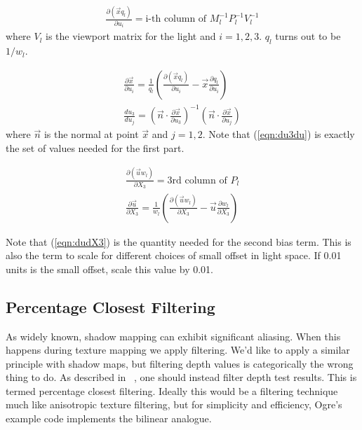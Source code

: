 \documentclass[]{article}  %
\begin{document}
\begin{eqnarray}  
\label{eqn:dxqdu}
  \frac{\partial (\vec{x} q_l)}{\partial u_i} = \mbox{i-th column of } M_l^{-1} P_l^{-1} V_l^{-1} 
\end{eqnarray}
where $V_l$ is the viewport matrix for the light and $i=1,2,3$.  $q_l$ turns out to be $1/w_l$.

\begin{eqnarray} 
\label{eqn:dxdu}
  \frac{\partial \vec{x}}{\partial u_i} = \frac{1}{q_l} \left( \frac{\partial (\vec{x} q_l)}{\partial u_i} - \vec{x}\frac{\partial q_l}{\partial u_i} \right) \\
\label{eqn:du3du}
  \frac{du_3}{du_j} = \left( \vec{n} \cdot \frac{\partial \vec{x}}{\partial u_3} \right)^{-1} \left( \vec{n} \cdot \frac{\partial \vec{x}}{\partial u_j} \right)
\end{eqnarray}
where $\vec{n}$ is the normal at point $\vec{x}$ and $j=1,2$.  Note that (\ref{eqn:du3du}) is exactly the set of values needed for the first part.


\begin{eqnarray}  
\label{eqn:duwdX3}
  \frac{\partial (\vec{u} w_l)}{\partial X_3} = \mbox{3rd column of } P_l \\
\label{eqn:dudX3}
  \frac{\partial \vec{u}}{\partial X_3} = \frac{1}{w_l} \left( \frac{\partial (\vec{u} w_l)}{\partial X_3} - \vec{u}\frac{\partial w_l}{\partial X_3} \right)
\end{eqnarray}

Note that (\ref{eqn:dudX3}) is the quantity needed for the second bias term.  This is also the term to scale for different choices of small offset in light space.  If 0.01 units is the small offset, scale this value by 0.01.  

\subsection{Percentage Closest Filtering}
As widely known, shadow mapping can exhibit significant aliasing.  When this happens during texture mapping we apply filtering.  We'd like to apply a similar principle with shadow maps, but filtering depth values is categorically the wrong thing to do.  As described in ~\cite{RSC87}, one should instead filter depth test results.  This is termed percentage closest filtering.  Ideally this would be a filtering technique much like anisotropic texture filtering, but for simplicity and efficiency, Ogre's example code implements the bilinear analogue.

\end{document}
